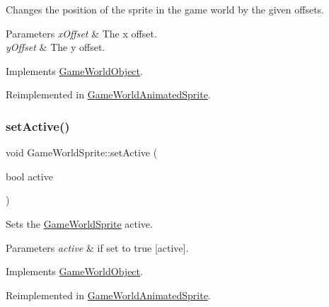Changes the position of the sprite in the game world by the given offsets. 


\begin{DoxyParams}{Parameters}
{\em x\+Offset} & The x offset.\\
\hline
{\em y\+Offset} & The y offset.\\
\hline
\end{DoxyParams}


Implements \hyperlink{class_game_world_object_a3ddbcf57e6eb43cb4aaec7ac347d4e17}{Game\+World\+Object}.



Reimplemented in \hyperlink{class_game_world_animated_sprite_ac1aa0ef5ec1a3278934238ea214624a4}{Game\+World\+Animated\+Sprite}.

\mbox{\label{class_game_world_sprite_a4b8597b947076f847d20c66be7db8847}} 
\subsubsection{\texorpdfstring{set\+Active()}{setActive()}}
{\footnotesize\ttfamily void Game\+World\+Sprite\+::set\+Active (\begin{DoxyParamCaption}\item[{bool}]{active }\end{DoxyParamCaption})\hspace{0.3cm}{\ttfamily [virtual]}}



Sets the \hyperlink{class_game_world_sprite}{Game\+World\+Sprite} active. 


\begin{DoxyParams}{Parameters}
{\em active} & if set to {\ttfamily true} \mbox{[}active\mbox{]}.\\
\hline
\end{DoxyParams}


Implements \hyperlink{class_game_world_object_a79d89ff68b9334b454300cf855719b77}{Game\+World\+Object}.



Reimplemented in \hyperlink{class_game_world_animated_sprite_a625b0d3876fbac51995bf048e94fd7e5}{Game\+World\+Animated\+Sprite}.

\mbox{\label{class_game_world_sprite_a533f3986452ad2859729d27cc09a5e53}} 
